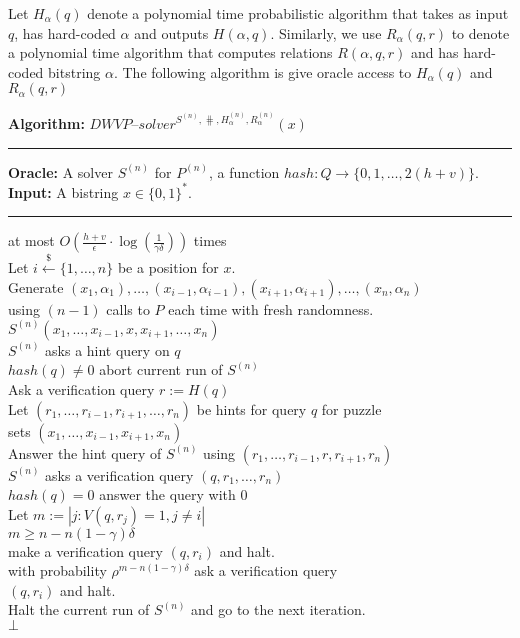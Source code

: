 Let $H_{\alpha}(q)$ denote a polynomial time probabilistic algorithm that takes as input $q$,
has hard-coded $\alpha$ and outputs $H(\alpha, q)$.
Similarly, we use $R_{\alpha}(q,r)$ to denote a polynomial time algorithm that computes relations
$R(\alpha, q, r)$ and has hard-coded bitstring $\alpha$.
The following algorithm is give oracle access to $H_{\alpha}(q)$ and $R_{\alpha}(q,r)$
%
\begin{codeblock}
  \textbf{Algorithm:} $\mathit{DWVP\text{--}solver}^{S^{(n)}, \hash, H_{\alpha}^{(n)}, R_{\alpha}^{(n)}}(x)$
  \medskip
  \hrule
  \textbf{Oracle:}  A solver $S^{(n)}$ for $P^{(n)}$, a function $hash : Q \rightarrow \{0,1, \dotsc, 2(h+v)\}$.\\
  \textbf{Input:} A bistring $x \in \{0,1\}^{*}$.
  \medskip\hrule
  \Repeat at most $O(\frac{h+v}{\epsilon} \cdot \log(\frac{1}{\gamma\delta}))$ times \\
  \IndI Let $i \xleftarrow{\$} \{1, \dotsc, n\}$ be a position for $x$.\\
  \IndI Generate $(x_1, \alpha_1), \dotsc, (x_{i-1}, \alpha_{i-1}), (x_{i+1}, \alpha_{i+1}), \dotsc, (x_n, \alpha_n)$ \\
  \IndI using $(n-1)$ calls to $P$ each time with fresh randomness.\\
  \IndI \Run $S^{(n)}(x_1, \dotsc, x_{i-1}, x, x_{i+1}, \dotsc, x_n)$\\
  \IndII \If $S^{(n)}$ asks a hint query on $q$ \Then \\
  \IndIII \If $hash(q) \neq 0$ \Then abort current run of $S^{(n)}$\\
  \IndIII Ask a verification query $r := H(q)$\\
  \IndIII Let $(r_1, \dotsc, r_{i-1}, r_{i+1}, \dotsc, r_{n})$ be hints for query $q$ for puzzle\\
  \IndIII sets $(x_1, \dotsc, x_{i-1}, x_{i+1}, x_n)$\\
  \IndIII Answer the hint query of $S^{(n)}$ using $(r_1, \dots, r_{i-1}, r, r_{i+1}, r_n)$\\
  \IndII \If $S^{(n)}$ asks a verification query $(q, r_1, \dots, r_n)$ \Then \\
  \IndIII \If $hash(q) = 0$ \Then answer the query with $0$\\
  \IndIII Let $m := |j: V(q,r_j) = 1, j \neq i|$\\
  \IndIII \If $m \geq n - n(1-\gamma)\delta$ \Then \\
  \IndIIII make a verification query $(q, r_i)$ and halt.\\
  \IndIII \Else with probability $\rho^{m - n(1-\gamma)\delta}$ ask a verification query \\
  \IndIIII $(q, r_i)$ and halt. \\
  \IndIII Halt the current run of $S^{(n)}$ and go to the next iteration.\\
  \Return $\bot$
\end{codeblock}

